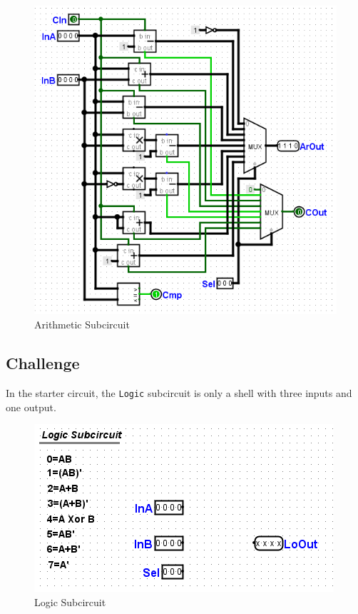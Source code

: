 \begin{figure}[H]
	\centering
	\includegraphics[width=\maxwidth{.95\linewidth}]{gfx/04-03}
	\caption{Arithmetic Subcircuit}
	\label{fig:04-03}
\end{figure}

\subsection{Challenge}

In the starter circuit, the \lstinline[columns=fixed]|Logic| subcircuit is only a shell with three inputs and one output.

\begin{figure}[H]
	\centering
	\includegraphics[width=\maxwidth{.95\linewidth}]{gfx/04-04}
	\caption{Logic Subcircuit}
	\label{fig:04-04}
\end{figure}

